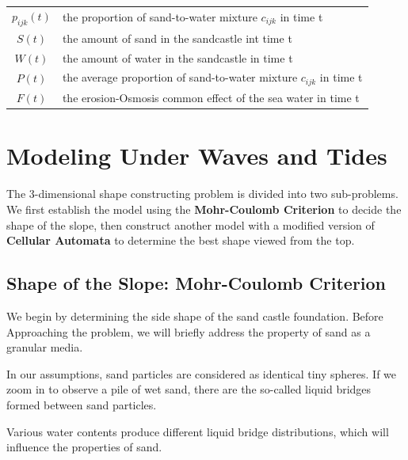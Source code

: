 \documentclass[12pt]{article}
\begin{document}
\begin{table}[H]
\begin{tabular}{cl}
        $p_{ijk}(t)$ & the proportion of sand-to-water mixture $c_{ijk}$ in time t         \\
        $S(t)$       & the amount of sand in the sandcastle	int time t                      \\
        $W(t)$       & the amount of water in the sandcastle in time t                     \\
        $P(t)$       & the average proportion of sand-to-water mixture $c_{ijk}$ in time t \\
        $F(t)$       & the erosion-Osmosis common effect of the sea water in time t        \\
        \hline
    \end{tabular}
    \label{bs2}
\end{table}

\section{Modeling Under Waves and Tides}
\par
The 3-dimensional shape constructing problem is divided into two sub-problems. We first establish the model using the \textbf{Mohr-Coulomb Criterion} to decide the shape of the slope, then construct another model with a modified version of \textbf{Cellular Automata} to determine the best shape viewed from the top.

\subsection{Shape of the Slope: Mohr-Coulomb Criterion}
We begin by determining the side shape of the sand castle foundation. Before Approaching the problem, we will briefly address the property of sand as a granular media.
\par
In our assumptions, sand particles are considered as identical tiny spheres. If we zoom in to observe a pile of wet sand, there are the so-called liquid bridges formed between sand particles.
\par
Various water contents produce different liquid bridge distributions, which will influence the properties of sand.
\end{document}
